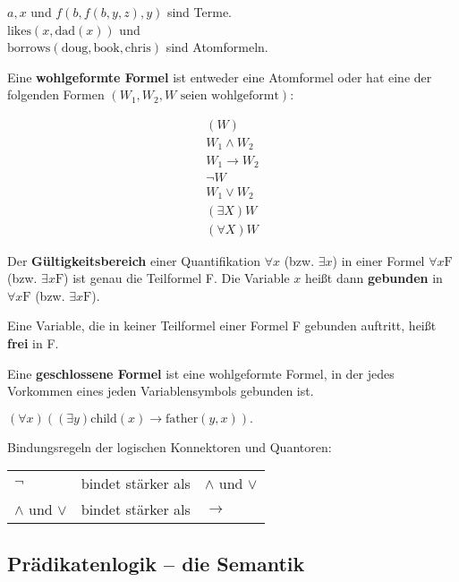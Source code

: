\documentclass[runningheads,deutsch]{llncs}
\begin{document}
\begin{example}
    $a, x$ und $f(b, f(b, y, z), y)$ sind Terme.\\
    $\text{likes}(x, \text{dad}(x))$ und \\
    $\text{borrows}(\text{doug}, \text{book}, \text{chris})$ sind Atomformeln.
\end{example}

Eine \textbf{wohlgeformte Formel} ist entweder eine Atomformel oder hat eine der folgenden Formen $(W_1, W_2, W \text{ seien wohlgeformt}):$

\begin{align}
    (W) \\
    W_1 \land W_2 \\
    W_1 \rightarrow W_2 \\
    \lnot W \\
    W_1 \lor W_2 \\
    (\exists X) W \\
    (\forall X) W
\end{align}

Der \textbf{Gültigkeitsbereich} einer Quantifikation $\forall x$ (bzw. $\exists x$) in einer Formel $\forall x \text{F}$ (bzw. $\exists x \text{F}$) ist genau die Teilformel F. Die Variable $x$ heißt dann \textbf{gebunden} in $\forall x \text{F}$ (bzw. $\exists x \text{F}$).

Eine Variable, die in keiner Teilformel einer Formel F gebunden auftritt, heißt \textbf{frei} in F.

Eine \textbf{geschlossene Formel} ist eine wohlgeformte Formel, in der jedes Vorkommen eines jeden Variablensymbols gebunden ist.

\begin{example}
    $(\forall x)((\exists y) \text{child}(x) \rightarrow \text{father}(y, x)).$
\end{example}

Bindungsregeln der logischen Konnektoren und Quantoren:

\setlength{\tabcolsep}{12pt}
\begin{center}    
    \begin{tabular}{l l l}
        $\lnot$           & bindet stärker als & $\land$ und $\lor$ \\
        $\land$ und $\lor$ & bindet stärker als & $\rightarrow$
    \end{tabular}
\end{center}

\subsection{Prädikatenlogik -- die Semantik}
\end{document}
